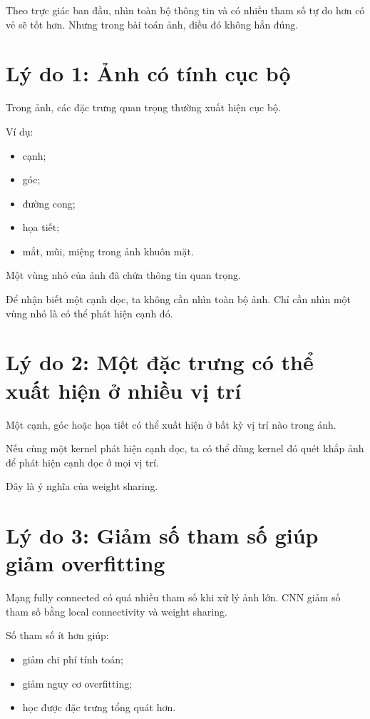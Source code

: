 \documentclass[12pt,a4paper]{report}
\begin{document}
Theo trực giác ban đầu, nhìn toàn bộ thông tin và có nhiều tham số tự do hơn có vẻ sẽ tốt hơn. Nhưng trong bài toán ảnh, điều đó không hẳn đúng.

\section{Lý do 1: Ảnh có tính cục bộ}

Trong ảnh, các đặc trưng quan trọng thường xuất hiện cục bộ.

Ví dụ:

\begin{itemize}
    \item cạnh;
    \item góc;
    \item đường cong;
    \item họa tiết;
    \item mắt, mũi, miệng trong ảnh khuôn mặt.
\end{itemize}

Một vùng nhỏ của ảnh đã chứa thông tin quan trọng.

\begin{vidu}
Để nhận biết một cạnh dọc, ta không cần nhìn toàn bộ ảnh. Chỉ cần nhìn một vùng nhỏ là có thể phát hiện cạnh đó.
\end{vidu}

\section{Lý do 2: Một đặc trưng có thể xuất hiện ở nhiều vị trí}

Một cạnh, góc hoặc họa tiết có thể xuất hiện ở bất kỳ vị trí nào trong ảnh.

Nếu cùng một kernel phát hiện cạnh dọc, ta có thể dùng kernel đó quét khắp ảnh để phát hiện cạnh dọc ở mọi vị trí.

Đây là ý nghĩa của weight sharing.

\section{Lý do 3: Giảm số tham số giúp giảm overfitting}

Mạng fully connected có quá nhiều tham số khi xử lý ảnh lớn. CNN giảm số tham số bằng local connectivity và weight sharing.

Số tham số ít hơn giúp:

\begin{itemize}
    \item giảm chi phí tính toán;
    \item giảm nguy cơ overfitting;
    \item học được đặc trưng tổng quát hơn.
\end{itemize}
\end{document}
